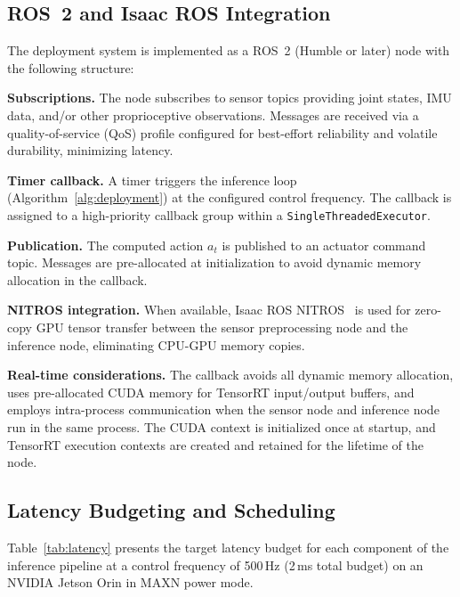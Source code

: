 \documentclass[conference]{IEEEtran}
\begin{document}
\subsection{ROS~2 and Isaac ROS Integration}\label{sec:ros2}

The deployment system is implemented as a ROS~2 (Humble or later) node
with the following structure:

\textbf{Subscriptions.}  The node subscribes to sensor topics providing
joint states, IMU data, and/or other proprioceptive observations.
Messages are received via a quality-of-service (QoS) profile configured
for best-effort reliability and volatile durability, minimizing latency.

\textbf{Timer callback.}  A timer triggers the inference loop
(Algorithm~\ref{alg:deployment}) at the configured control frequency.
The callback is assigned to a high-priority callback group within a
\texttt{SingleThreadedExecutor}.

\textbf{Publication.}  The computed action $a_t$ is published to an
actuator command topic.  Messages are pre-allocated at initialization to
avoid dynamic memory allocation in the callback.

\textbf{NITROS integration.}  When available, Isaac ROS
NITROS~\cite{nvidia2024isaacros} is used for zero-copy GPU tensor
transfer between the sensor preprocessing node and the inference node,
eliminating CPU-GPU memory copies.

\textbf{Real-time considerations.}  The callback avoids all dynamic
memory allocation, uses pre-allocated CUDA memory for TensorRT input/output
buffers, and employs intra-process communication when the sensor node and
inference node run in the same process.  The CUDA context is initialized
once at startup, and TensorRT execution contexts are created and
retained for the lifetime of the node.

\subsection{Latency Budgeting and Scheduling}\label{sec:latency}

Table~\ref{tab:latency} presents the target latency budget for each
component of the inference pipeline at a control frequency of 500\,Hz
(2\,ms total budget) on an NVIDIA Jetson Orin in MAXN power mode.
\end{document}

